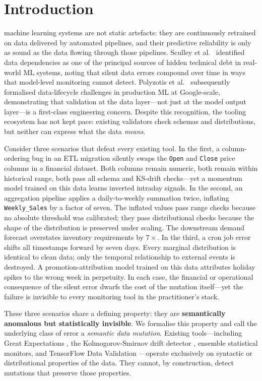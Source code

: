 \documentclass[journal]{IEEEtran}
\begin{document}
\section{Introduction}
\label{sec:intro}


 machine learning systems are not static artefacts: they are
continuously retrained on data delivered by automated pipelines, and their
predictive reliability is only as sound as the data flowing through those
pipelines.  Sculley et al.\ \cite{sculley2015} identified data dependencies
as one of the principal sources of hidden technical debt in real-world ML
systems, noting that silent data errors compound over time in ways that
model-level monitoring cannot detect.  Polyzotis et al.\ \cite{polyzotis2018}
subsequently formalised data-lifecycle challenges in production ML at
Google-scale, demonstrating that validation at the data layer---not just at
the model output layer---is a first-class engineering concern.  Despite this
recognition, the tooling ecosystem has not kept pace: existing validators
check schemas and distributions, but neither can express what the data
\emph{means}.

Consider three scenarios that defeat every existing tool.  In the first, a
column-ordering bug in an ETL migration silently swaps the \texttt{Open} and
\texttt{Close} price columns in a financial dataset.  Both columns remain
numeric, both remain within historical range, both pass all schema and
KS-drift checks---yet a momentum model trained on this data learns
inverted intraday signals.  In the second, an aggregation pipeline applies a
daily-to-weekly summation twice, inflating \texttt{Weekly\_Sales} by a
factor of seven.  The inflated values pass range checks because no absolute
threshold was calibrated; they pass distributional checks because the shape
of the distribution is preserved under scaling.  The downstream demand
forecast overstates inventory requirements by $7\times$.  In the third, a
cron job error shifts all timestamps forward by seven days.  Every marginal
distribution is identical to clean data; only the temporal relationship to
external events is destroyed.  A promotion-attribution model trained on this
data attributes holiday spikes to the wrong week in perpetuity.
In each case, the financial or operational consequence of the silent error
dwarfs the cost of the mutation itself---yet the failure is invisible to
every monitoring tool in the practitioner's stack.

These three scenarios share a defining property: they are
\textbf{semantically anomalous but statistically invisible}.  We formalise
this property and call the underlying class of error a
\emph{semantic data mutation}.  Existing tools---including Great
Expectations \cite{greatexpectations2023}, the Kolmogorov-Smirnov drift
detector \cite{kolmogorov1933}, ensemble statistical monitors, and
TensorFlow Data Validation \cite{baylor2017tfx}---operate exclusively on
syntactic or distributional properties of the data.  They cannot, by
construction, detect mutations that preserve those properties.
\end{document}

